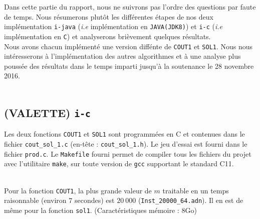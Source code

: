 Dans cette partie du rapport, nous ne suivrons pas l'ordre des
questions par faute de temps. Nous r\'esumerons plut\^ot les
différentes \'etapes de nos deux impl\'ementation \verb'i-java'
(\emph{i.e} impl\'ementation en \verb'JAVA(JDK8)') et \verb'i-c'
(\emph{i.e} impl\'ementation en \verb'C') et analyserons bri\`evement
quelques r\'esultats.\\

Nous avons chacun impl\'ement\'e une version diff\'ente de
\verb'COUT1' et \verb'SOL1'. Nous nous int\'eresserons \`a
l'impl\'ementation des autres algorithmes et \`a une analyse plus
pouss\'ee des r\'esultats dans le temps imparti jusqu'\`a la
soutenance le 28 novembre 2016.\\\\

\subsection{(VALETTE) \texttt{i-c}}
Les deux fonctions \texttt{COUT1} et \texttt{SOL1} sont programm\'ees
en C et contenues dans le fichier \texttt{cout\_sol\_1.c} (en-t\^ete :
\texttt{cout\_sol\_1.h}). Le jeu d'essai est fourni dans le fichier
\texttt{prod.c}. Le \texttt{Makefile} fourni permet de compiler tous
les fichiers du projet avec l'utilitaire \texttt{make}, sur toute
version de \texttt{gcc} supportant le standard C11.\\\\

\begin{figure*}[h]
\centering
{}
\end{figure*}

Pour la fonction \texttt{COUT1}, la plus grande valeur de $m$
traitable en un temps raisonnable (environ $7$ secondes) est $20\ 000$
(\texttt{Inst\_20000\_64.adn}). Il en est de m\^eme pour la fonction
\texttt{sol1}. (Caract\'eristiques m\'emoire : $8$Go)

